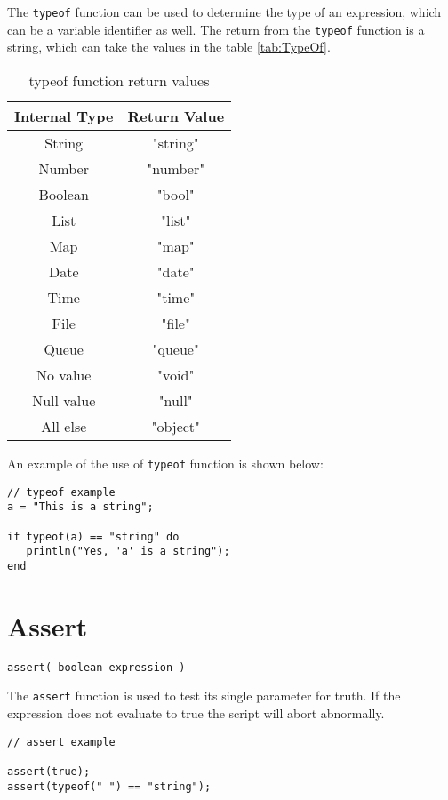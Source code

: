 The \Verb+typeof+ function can be used to determine the type of an expression, which can be a variable identifier as well. The return from the \verb+typeof+ function is a string, which can take the values in the table \vref{tab:TypeOf}.

\begin{table}[h!]
\centering
\begin{tabular} { | c | c | }
\hline
Internal Type     &  Return Value \\
\hline
String & "string" \\
Number &"number" \\
Boolean & "bool" \\
List & "list" \\
Map & "map" \\
Date & "date" \\
Time & "time" \\
File & "file" \\
Queue & "queue" \\
No value & "void" \\
Null value & "null" \\
All else & "object" \\
\hline
\end{tabular}
\label{tab:TypeOf}
\caption{typeof function return values}
\end{table}

An example of the use of \Verb+typeof+ function is shown below:

\begin{lstlisting}[caption={Typeof example}]
// typeof example
a = "This is a string";

if typeof(a) == "string" do
   println("Yes, 'a' is a string");
end

\end{lstlisting}

\section{Assert}
\begin{Verbatim}
assert( boolean-expression )
\end{Verbatim}

The \Verb+assert+ function is used to test its single parameter for truth. If the expression does not evaluate to true the \Reflex script will abort abnormally.

\begin{lstlisting}[caption={Assert example}]
// assert example

assert(true);
assert(typeof(" ") == "string");

\end{lstlisting}

